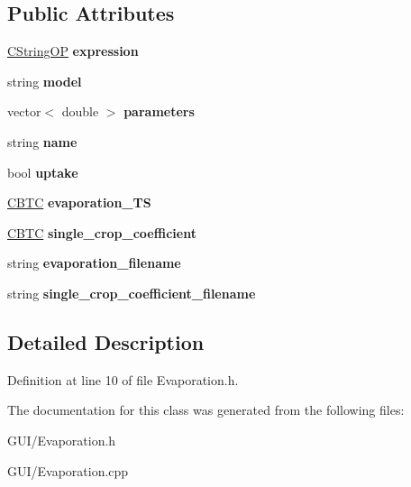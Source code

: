 \subsection*{Public Attributes}
\begin{DoxyCompactItemize}
\item 
\mbox{\label{class_c_evaporation_a42b15076c82517e2267df8db9f78eb1b}} 
\hyperlink{class_c_string_o_p}{C\+String\+OP} {\bfseries expression}
\item 
\mbox{\label{class_c_evaporation_a393ed9851cb7bd934ee50f8cf1ac86e2}} 
string {\bfseries model}
\item 
\mbox{\label{class_c_evaporation_a82206d08351d06d389413864adee9840}} 
vector$<$ double $>$ {\bfseries parameters}
\item 
\mbox{\label{class_c_evaporation_a03990badc85766212904b37292d6f453}} 
string {\bfseries name}
\item 
\mbox{\label{class_c_evaporation_ac0784b953600b86facaaee12a370fb69}} 
bool {\bfseries uptake}
\item 
\mbox{\label{class_c_evaporation_a3677317a5a5a833498c3b8758e855643}} 
\hyperlink{class_c_b_t_c}{C\+B\+TC} {\bfseries evaporation\+\_\+\+TS}
\item 
\mbox{\label{class_c_evaporation_ad276b9d62d9cce2578ef1cd8bf311ed5}} 
\hyperlink{class_c_b_t_c}{C\+B\+TC} {\bfseries single\+\_\+crop\+\_\+coefficient}
\item 
\mbox{\label{class_c_evaporation_a686ca247a2ea157d8a629e4550088457}} 
string {\bfseries evaporation\+\_\+filename}
\item 
\mbox{\label{class_c_evaporation_abe1e8dbda98781cf75349da86ba81667}} 
string {\bfseries single\+\_\+crop\+\_\+coefficient\+\_\+filename}
\end{DoxyCompactItemize}


\subsection{Detailed Description}


Definition at line 10 of file Evaporation.\+h.



The documentation for this class was generated from the following files\+:\begin{DoxyCompactItemize}
\item 
G\+U\+I/Evaporation.\+h\item 
G\+U\+I/Evaporation.\+cpp\end{DoxyCompactItemize}
